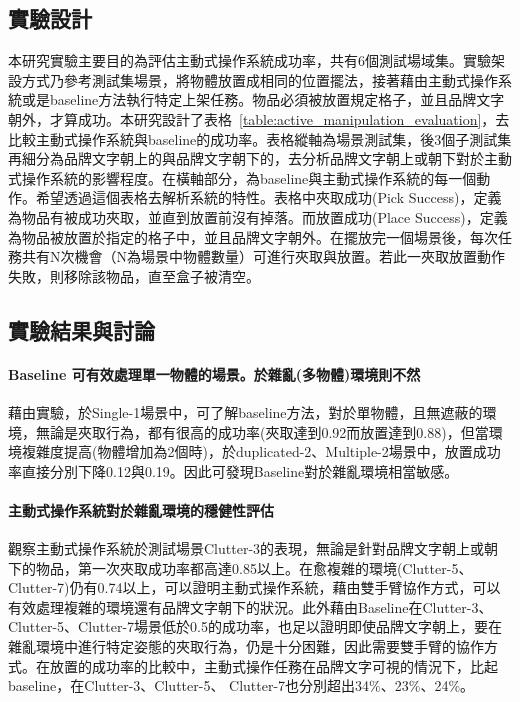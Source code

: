 \subsection{實驗設計}
本研究實驗主要目的為評估主動式操作系統成功率，共有6個測試場域集。實驗架設方式乃參考測試集場景，將物體放置成相同的位置擺法，接著藉由主動式操作系統或是baseline方法執行特定上架任務。物品必須被放置規定格子，並且品牌文字朝外，才算成功。本研究設計了表格~\ref{table:active_manipulation_evaluation}，去比較主動式操作系統與baseline的成功率。表格縱軸為場景測試集，後3個子測試集再細分為品牌文字朝上的與品牌文字朝下的，去分析品牌文字朝上或朝下對於主動式操作系統的影響程度。在橫軸部分，為baseline與主動式操作系統的每一個動作。希望透過這個表格去解析系統的特性。表格中夾取成功(Pick Success)，定義為物品有被成功夾取，並直到放置前沒有掉落。而放置成功(Place Success)，定義為物品被放置於指定的格子中，並且品牌文字朝外。在擺放完一個場景後，每次任務共有N次機會（N為場景中物體數量）可進行夾取與放置。若此一夾取放置動作失敗，則移除該物品，直至盒子被清空。




\subsection{實驗結果與討論}

\paragraph{Baseline 可有效處理單一物體的場景。於雜亂(多物體)環境則不然}
藉由實驗，於Single-1場景中，可了解baseline方法，對於單物體，且無遮蔽的環境，無論是夾取行為，都有很高的成功率(夾取達到0.92而放置達到0.88)，但當環境複雜度提高(物體增加為2個時)，於duplicated-2、Multiple-2場景中，放置成功率直接分別下降0.12與0.19。因此可發現Baseline對於雜亂環境相當敏感。

\paragraph{主動式操作系統對於雜亂環境的穩健性評估}
觀察主動式操作系統於測試場景Clutter-3的表現，無論是針對品牌文字朝上或朝下的物品，第一次夾取成功率都高達0.85以上。在愈複雜的環境(Clutter-5、Clutter-7)仍有0.74以上，可以證明主動式操作系統，藉由雙手臂協作方式，可以有效處理複雜的環境還有品牌文字朝下的狀況。此外藉由Baseline在Clutter-3、Clutter-5、Clutter-7場景低於0.5的成功率，也足以證明即使品牌文字朝上，要在雜亂環境中進行特定姿態的夾取行為，仍是十分困難，因此需要雙手臂的協作方式。在放置的成功率的比較中，主動式操作任務在品牌文字可視的情況下，比起baseline，在Clutter-3、Clutter-5、 Clutter-7也分別超出34\%、23\%、24\%。

